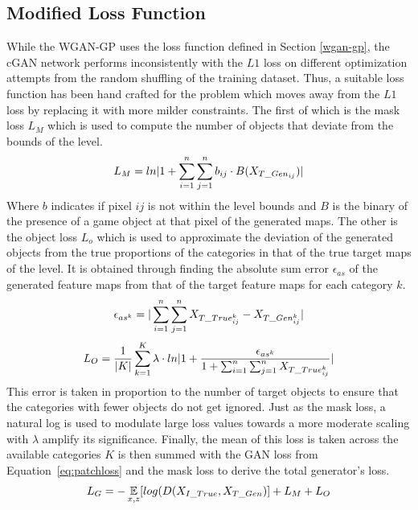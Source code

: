 \documentclass{Configuration_Files/PoliMi3i_thesis}
\begin{document}
\subsection{Modified Loss Function}
While the WGAN-GP uses the loss function defined in Section \ref{wgan-gp}, the cGAN network 
performs inconsistently with the $L1$ loss on different optimization attempts from the random 
shuffling of the training dataset. Thus, a suitable loss function has been hand crafted for the 
problem which moves away from the $L1$ loss by replacing it with more milder constraints. 
The first of which is the mask loss $L_{M}$ which is used to compute the number of objects 
that deviate from the bounds of the level. 
\begin{equation} \label{eq:maskloss}
L_{M} = ln|1+\sum_{i=1}^n \sum_{j=1}^n b_{ij} \cdot B(X_{T\char`_Gen_{ij}})|
\end{equation}
Where $b$ indicates if pixel $ij$ is not within the level bounds and $B$ is the binary of the 
presence of a game object at that pixel of the generated maps. The other 
is the object loss $L_{o}$ which is used to approximate the deviation  of the generated objects from 
the true proportions of the categories in that of the true target maps of the level. It is obtained 
through finding the absolute sum error $\epsilon_{as}$ of the generated feature maps from 
that of the target feature maps for each category $k$.
\begin{equation} \label{eq:ase}
\epsilon_{as^k} = |\sum_{i=1}^n \sum_{j=1}^n X_{T\char`_True_{ij}^k} - X_{T\char`_Gen_{ij}^k}|
\end{equation}
\begin{equation} \label{eq:objectloss}
L_{O} = \dfrac{1}{|K|}\sum_{k=1}^K\lambda \cdot ln|1+ \dfrac{\epsilon_{as^k}}{1+ \sum_{i=1}^n \sum_{j=1}^nX_{T\char`_True_{ij}^k}}|
\end{equation}
This error is taken in proportion to the number of target objects to ensure that the categories 
with fewer objects do not get ignored. Just as the mask loss, a natural log is used to modulate  
large loss values towards a more moderate scaling with $\lambda$ amplify its significance. 
Finally, the mean of this loss is taken across the available categories $K$ is then summed with 
the GAN loss from Equation~\ref{eq:patchloss} and the mask loss to derive the total generator’s loss.
\begin{equation} \label{eq:genloss}
L_{G}=-\mathop{{}\mathbb{E}}_{x,z}[log(D(X_{I\char`_True},X_{T\char`_Gen})] + L_{M} + L_{O}
\end{equation}
\end{document}
